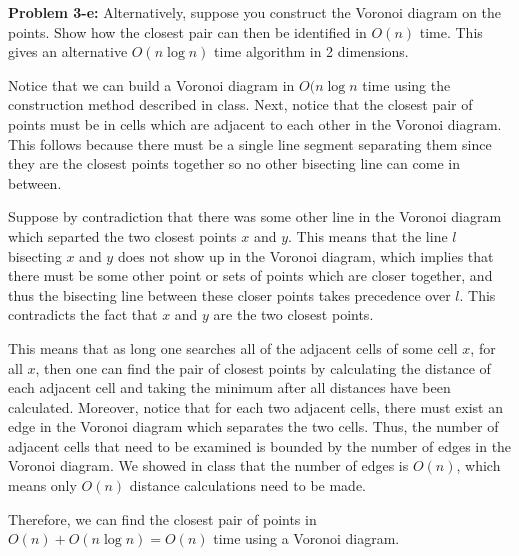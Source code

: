 \documentclass[psamsfonts]{amsart}
\newenvironment{sol}{\vspace{0.25cm}{\large \bfseries Solution:}}{\qedsymbol}
\newenvironment{prob}[1]{\begin{framed}{\large \bfseries Problem #1:}}{\end{framed}}
\begin{document}
\begin{prob}{3-e}
Alternatively, suppose you construct the Voronoi diagram on the points. Show how the closest pair can then be identified in $O(n)$ time. This gives an alternative $O(n \log n)$ time algorithm in 2 dimensions.
\end{prob}
\begin{sol}
Notice that we can build a Voronoi diagram in $O(n \log n$ time using the construction method described in class. Next, notice that the closest pair of points must be in cells which are adjacent to each other in the Voronoi diagram. This follows because there must be a single line segment separating them since they are the closest points together so no other bisecting line can come in between. 

Suppose by contradiction that there was some other line in the Voronoi diagram which separted the two closest points $x$ and $y$. This means that the line $l$ bisecting $x$ and $y$ does not show up in the Voronoi diagram, which implies that there must be some other point or sets of points which are closer together, and thus the bisecting line between these closer points takes precedence over $l$. This contradicts the fact that $x$ and $y$ are the two closest points.

This means that as long one searches all of the adjacent cells of some cell $x$, for all $x$, then one can find the pair of closest points by calculating the distance of each adjacent cell and taking the minimum after all distances have been calculated. Moreover, notice that for each two adjacent cells, there must exist an edge in the Voronoi diagram which separates the two cells. Thus, the number of adjacent cells that need to be examined is bounded by the number of edges in the Voronoi diagram. We showed in class that the number of edges is $O(n)$, which means only $O(n)$ distance calculations need to be made.

Therefore, we can find the closest pair of points in $O(n) + O(n \log n) = O(n)$ time using a Voronoi diagram.
\end{sol}
\end{document}
